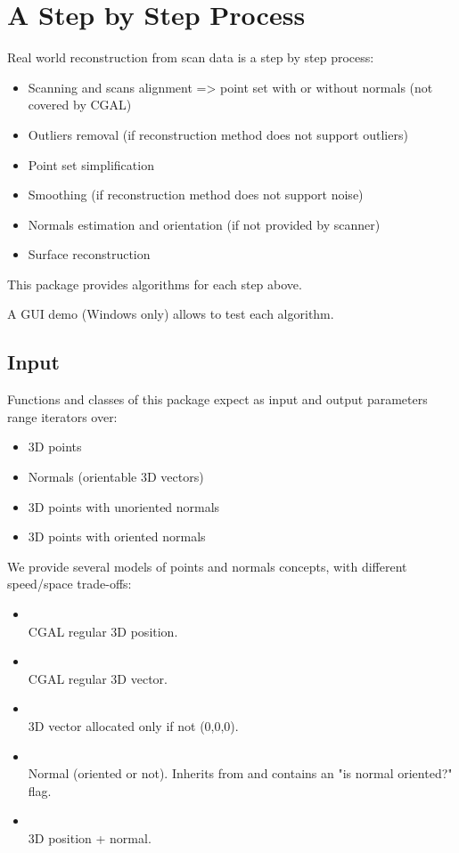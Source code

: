 \section{A Step by Step Process}

Real world reconstruction from scan data is a step by step process:

\begin{itemize}
\item Scanning and scans alignment => point set with or without normals (not covered by CGAL)
\item Outliers removal (if reconstruction method does not support outliers)
\item Point set simplification
\item Smoothing (if reconstruction method does not support noise)
\item Normals estimation and orientation (if not provided by scanner)
\item Surface reconstruction
\end{itemize}

This package provides algorithms for each step above.

A GUI demo (Windows only) allows to test each algorithm.


\subsection{Input}

Functions and classes of this package expect as input and output parameters range iterators over:

\begin{itemize}
\item 3D points
\item Normals (orientable 3D vectors)
\item 3D points with unoriented normals
\item 3D points with oriented normals
\end{itemize}

We provide several models of points and normals concepts, with different speed/space trade-offs:

\begin{itemize}
\item {} \\
CGAL regular 3D position.
\item {} \\
CGAL regular 3D vector.
\item {} \\
3D vector allocated only if not (0,0,0).
\item {} \\
Normal (oriented or not).
Inherits from  and contains an "is normal oriented?" flag.
\item {} \\
3D position + normal.
\end{itemize}

